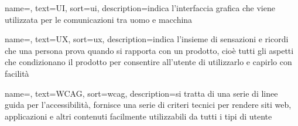  {
    name=,
    text=UI,
    sort=ui,
    description={indica l'interfaccia grafica che viene utilizzata per le comunicazioni tra uomo e macchina}
}

 {
    name=,
    text=UX,
    sort=ux,
    description={indica l'insieme di sensazioni e ricordi che una persona prova quando si rapporta con un prodotto, cioè tutti gli aspetti che condizionano il prodotto per consentire all'utente di utilizzarlo e capirlo con facilità}
}

 {
    name=,
    text=WCAG,
    sort=wcag,
    description={si tratta di una serie di linee guida per l'accessibilità, fornisce una serie di criteri tecnici per rendere siti web, applicazioni e altri contenuti facilmente utilizzabili da tutti i tipi di utente}
}
